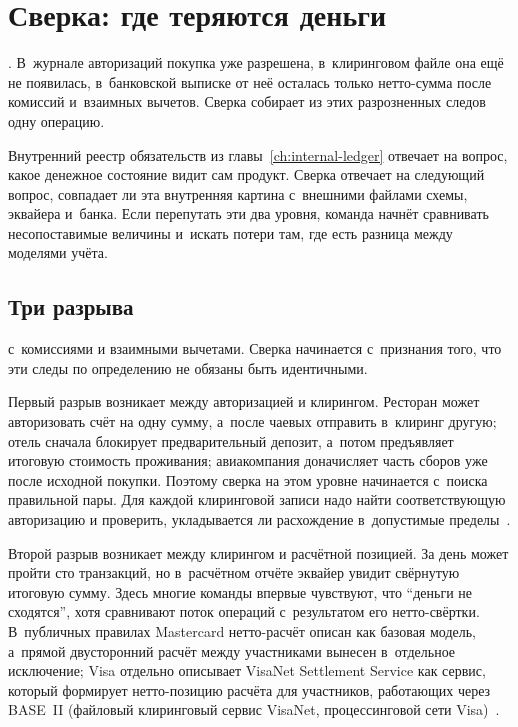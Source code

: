 
\chapter{Сверка: где теряются деньги}\label{ch:reconciliation}

. В~журнале авторизаций покупка уже разрешена, в~клиринговом файле она ещё не появилась, в~банковской выписке от неё осталась только нетто-сумма после комиссий и~взаимных вычетов. Сверка собирает из этих разрозненных следов одну операцию.

Внутренний реестр обязательств из главы~\ref{ch:internal-ledger}
отвечает на вопрос, какое денежное состояние видит сам продукт.
Сверка отвечает на следующий вопрос, совпадает ли эта внутренняя картина
с~внешними файлами схемы, эквайера и~банка. Если перепутать эти два уровня, команда начнёт сравнивать несопоставимые величины и~искать
потери там, где есть разница между моделями учёта.

\section{Три разрыва}\label{sec:recon-gaps}

 с~комиссиями и взаимными вычетами.
Сверка начинается с~признания того, что эти следы по определению не обязаны
быть идентичными.

Первый разрыв возникает между авторизацией и клирингом. Ресторан может
авторизовать счёт на одну сумму, а~после чаевых отправить в~клиринг
другую; отель сначала блокирует предварительный депозит, а~потом
предъявляет итоговую стоимость проживания; авиакомпания доначисляет
часть сборов уже после исходной покупки. Поэтому сверка на этом уровне
начинается с~поиска правильной
пары. Для каждой клиринговой записи надо найти соответствующую
авторизацию и проверить, укладывается ли расхождение в~допустимые
пределы~\cite{visa-tadg,mc-tpr}.

Второй разрыв возникает между клирингом и расчётной позицией. За день
может пройти сто транзакций, но в~расчётном отчёте эквайер увидит
свёрнутую итоговую сумму. Здесь многие команды впервые чувствуют, что
\enquote{деньги не сходятся}, хотя сравнивают поток
операций с~результатом его нетто-свёртки. В~публичных правилах Mastercard нетто-расчёт описан как
базовая модель, а~прямой двусторонний расчёт между участниками вынесен
в~отдельное
исключение; Visa отдельно описывает VisaNet
Settlement Service как сервис, который формирует нетто-позицию расчёта
для участников, работающих через BASE~II (файловый клиринговый сервис
VisaNet, процессинговой сети Visa)~\cite{mc-rules,visa-core-rules,visa-visanet-booklet}.

